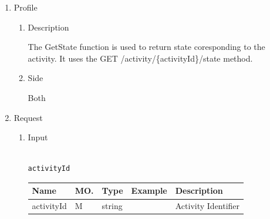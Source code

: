 \begin{enumerate}

\item Profile

\begin{enumerate}

\item Description

The GetState function is used to return state coresponding to the activity.  
It uses the GET /activity/\{activityId\}/state method. 

\item Side

Both

\end{enumerate}

\item Request

\begin{enumerate}

\item Input

\begin{tcolorbox}[boxrule=0pt, frame empty]
\begin{verbatim}

activityId

\end{verbatim}
\end{tcolorbox}





\begin{table}[H]
\footnotesize

\begin{center}
\begin{tabular}{|p{3cm}|l|p{3cm}|p{3cm}|p{4cm}|} 
\hline
\rowcolor{lightgray}	Name	& MO.	& Type	& Example & 	Description \\
\hline

activityId				& M	& 	string				&								&	Activity Identifier \\ 
\hline



\end{tabular}
\end{center}
\end{table}
\end{enumerate}
\end{enumerate}
